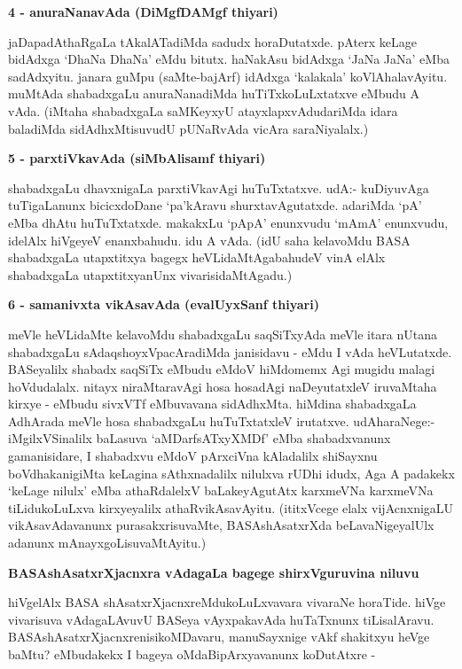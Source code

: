 {\bigskip
\noindent
{\large\bf 4 - anuraNanavAda (DiMgfDAMgf thiyari)}}
\medskip

\noindent
jaDapadAthaRgaLa tAkalATadiMda sadudx horaDutatxde. pAterx keLage bidAdxga `DhaNa DhaNa' eMdu bitutx. haNakAsu bidAdxga `JaNa JaNa' eMba sadAdxyitu. janara guMpu (saMte-bajArf) idAdxga `kalakala' koVlAhalavAyitu. muMtAda shabadxgaLu anuraNanadiMda huTiTxkoLuLxtatxve eMbudu A vAda. (iMtaha\- shabadxgaLa saMKeyxyU atayxlapxvAdudariMda idara baladiMda sidAdhxMtisuvudU pUNaRvAda vicAra saraNi\-yalalx.)

{\bigskip
\noindent
{\large\bf 5 - parxtiVkavAda (siMbAlisamf thiyari)}}
\medskip

\noindent
shabadxgaLu dhavxnigaLa parxtiVkavAgi huTuTxtatxve. udA:- kuDiyuvAga tuTigaLanunx bicicxdoDane `pa'kA\-ravu shurxta\-vAgutatxde. adariMda `pA' eMba dhAtu huTuTxtatxde. makakxLu `pApA' enunxvudu `mAmA' enunxvudu, idelAlx hiVgeyeV enanxbahudu. idu A vAda. (idU saha kelavoMdu BASA shabadxgaLa utapxtitxya bagegx heVLidaMtAgabahudeV vinA elAlx shabadxgaLa utapxtitxyanUnx vivarisidaMtAgadu.)

{\bigskip
\noindent
{\large\bf 6 - samanivxta vikAsavAda (evalUyxSanf thiyari)}}
\medskip

\noindent
meVle heVLidaMte kelavoMdu shabadxgaLu saqSiTxyAda meVle itara nUtana shabadxgaLu sAdaqshoyxVpa\-cAradiMda janisidavu - eMdu I vAda heVLutatxde. BASeyalilx shabadx saqSiTx eMbudu eMdoV hiMdomemx\- Agi mugidu malagi hoVdudalalx. nitayx niraMtaravAgi hosa hosadAgi naDeyutatxleV iruvaMtaha kirxye - eMbudu sivxVTf eMbuvavana sidAdhxMta. hiMdina shabadxgaLa AdhArada meVle hosa shabadxgaLu huTuTxtatxleV irutatxve. udAharaNege:- iMgilxVSinalilx baLasuva `aMDarfsATxyXMDf' eMba shabadxvanunx gamanisidare, I shabadxvu eMdoV pArxciVna kAladalilx shiSayxnu boVdhakanigiMta keLagina sAthxnadalilx nilulxva rUDhi idudx, Aga A padakekx `keLage nilulx' eMba athaRdalelxV baLakeyAgutAtx karxmeVNa karxmeVNa tiLidukoLuLxva kirxyeyalilx athaRvikAsavAyitu. (ititxVcege elalx vijAcnxnigaLU vikAsavAdavanunx purasakxrisuvaMte, BASAshAsatxrXda beLavaNigeyalUlx adanunx mAnayxgoLisuvaMtAyitu.)

{\bigskip
\noindent
{\large\bf BASAshAsatxrXjacnxra vAdagaLa bagege shirxVguruvina niluvu}}\label{page5}
\medskip

\noindent
hiVgelAlx BASA shAsatxrXjacnxreMdukoLuLxvavara vivaraNe horaTide. hiVge vivarisuva vAdagaLAvuvU BASeya vAyxpakavAda huTaTxnunx tiLisalAravu. BASAshAsatxrXjacnx\-renisikoMDavaru, manuSayxnige vAkf shakitxyu heVge baMtu? eMbudakekx I bageya oMdaBipArxyavanunx koDutAtxre - 


